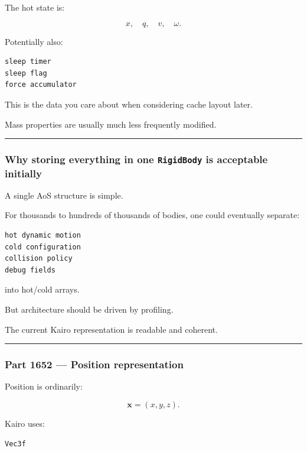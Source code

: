 The hot state is:

\[
x,\quad q,\quad v,\quad\omega.
\]

Potentially also:

\begin{verbatim}
sleep timer
sleep flag
force accumulator
\end{verbatim}

This is the data you care about when considering cache layout later.

Mass properties are usually much less frequently modified.

\begin{center}\rule{0.5\linewidth}{0.5pt}\end{center}

\subsubsection{\texorpdfstring{Why storing everything in one \texttt{RigidBody} is acceptable initially}{Why storing everything in one RigidBody is acceptable initially}}\label{why-storing-everything-in-one-rigidbody-is-acceptable-initially}

A single AoS structure is simple.

For thousands to hundreds of thousands of bodies, one could eventually separate:

\begin{verbatim}
hot dynamic motion
cold configuration
collision policy
debug fields
\end{verbatim}

into hot/cold arrays.

But architecture should be driven by profiling.

The current Kairo representation is readable and coherent.

\begin{center}\rule{0.5\linewidth}{0.5pt}\end{center}

\subsubsection{Part 1652 --- Position representation}\label{part-1652-position-representation}

Position is ordinarily:

\[
\mathbf x=(x,y,z).
\]

Kairo uses:

\begin{verbatim}
Vec3f
\end{verbatim}

